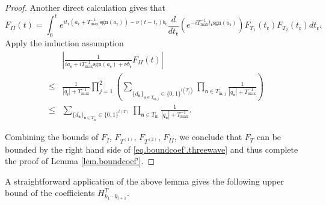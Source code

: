 \begin{proof}
Another direct calculation gives that 
\begin{equation}
    F_{II}(t)=\int^t_0  e^{it_{\mathfrak{r}}(a_{\mathfrak{r}}+T^{-1}_{\text{max}}\, \text{sgn}(a_{\mathfrak{r}}))- \nu(t-t_{\mathfrak{r}})b_{\mathfrak{r}}} \frac{d}{dt_{\mathfrak{r}}}(e^{-iT^{-1}_{\text{max}}t_{\mathfrak{r}} \text{sgn}(a_{\mathfrak{r}})})  F_{T_1}(t_{\mathfrak{r}})F_{T_2}(t_{\mathfrak{r}}) dt_{\mathfrak{r}}.
\end{equation}
Apply the induction assumption
\begin{equation}
\begin{split}
    &\left| \frac{1}{ia_{\mathfrak{r}}+iT^{-1}_{\text{max}} \text{sgn}(a_{\mathfrak{r}})+\nu b_{\mathfrak{r}} } F_{II}(t)\right|
    \\
    \le& \frac{1}{|q_{\mathfrak{r}}|+T^{-1}_{\text{max}}}\prod_{j=1}^2\left(\sum_{\{d_{\mathfrak{n}}\}_{\mathfrak{n}\in T_{\text{in},j}}\in\{0,1\}^{l(T_j)}}\prod_{\mathfrak{n}\in T_{\text{in},j}}\frac{1}{|q_{\mathfrak{n}}|+T^{-1}_{\text{max}}}\right)
    \\
    \le& \sum_{\{d_{\mathfrak{n}}\}_{\mathfrak{n}\in T_{\text{in}}}\in\{0,1\}^{l(T)}}\prod_{\mathfrak{n}\in T_{\text{in}}}\frac{1}{|q_{\mathfrak{n}}|+T^{-1}_{\text{max}}}.
\end{split}
\end{equation}

Combining the bounds of $F_{I}$, $F_{T^{(1)}}$, $F_{T^{(2)}}$, $F_{II}$, we conclude that $F_T$ can be bounded by the right hand side of \eqref{eq.boundcoef'.threewave} and thus complete the proof of Lemma \ref{lem.boundcoef'}.
\end{proof}
 





A straightforward application of the above lemma gives the following upper bound of the coefficients $H^T_{k_1\cdots k_{l+1}}$. 


